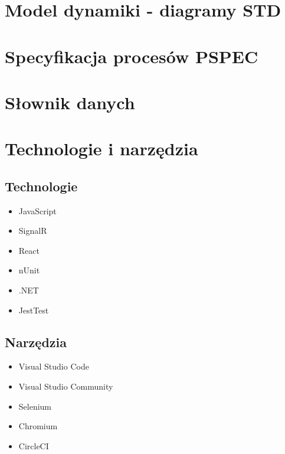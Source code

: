 \documentclass[12pt]{report}
\begin{document}
	
	\chapter{Model dynamiki - diagramy STD}
	
	\chapter{Specyfikacja procesów PSPEC}
	
	
	\chapter{Słownik danych}
	
	\chapter{Technologie i narzędzia}	
		\section{Technologie}
		\begin{itemize}
			\item JavaScript
			\item SignalR
			\item React
			\item nUnit
			\item .NET
			\item JestTest
		\end{itemize}
		
		\section{Narzędzia}
		\begin{itemize}
			\item Visual Studio Code
			\item Visual Studio Community
			\item Selenium
			\item Chromium
			\item CircleCI
		\end{itemize}
	
\end{document}
